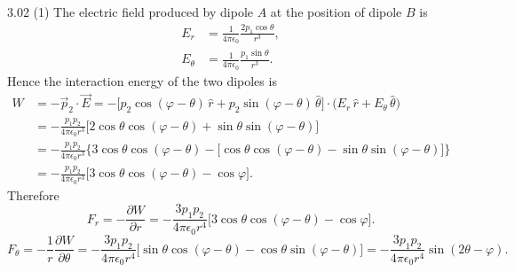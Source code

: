 \begin{solution}{3.02}
(1) The electric field produced by dipole $A$ at the position of dipole $B$ is
\begin{align*}
E_r&=\frac{1}{4\pi\epsilon_0}\frac{2p_1\cos\theta}{r^3},\\
E_\theta&=\frac{1}{4\pi\epsilon_0}\frac{p_1\sin\theta}{r^3}.
\end{align*}
Hence the interaction energy of the two dipoles is
\begin{align*}
W&=-\vec{p}_2\cdot\vec{E}
=-\bigl[p_2\cos(\varphi-\theta)\,\hat{r}+p_2\sin(\varphi-\theta)\,\hat{\theta}\bigr]
\cdot\bigl(E_r\,\hat{r}+E_\theta\,\hat{\theta}\bigr)\\
&=-\frac{p_1p_2}{4\pi\epsilon_0r^3}\bigl[2\cos\theta\cos(\varphi-\theta)+\sin\theta\sin(\varphi-\theta)\bigr]\\
&=-\frac{p_1p_2}{4\pi\epsilon_0r^3}\bigl\{3\cos\theta\cos(\varphi-\theta)
-\bigl[\cos\theta\cos(\varphi-\theta)-\sin\theta\sin(\varphi-\theta)\bigr]\bigr\}\\
&=-\frac{p_1p_2}{4\pi\epsilon_0r^3}\bigl[3\cos\theta\cos(\varphi-\theta)-\cos\varphi\bigr].
\end{align*}
Therefore
\[
F_r=-\frac{\partial W}{\partial r}
=-\frac{3p_1p_2}{4\pi\epsilon_0r^4}\bigl[3\cos\theta\cos(\varphi-\theta)-\cos\varphi\bigr].
\]
\[
F_\theta=-\frac{1}{r}\frac{\partial W}{\partial\theta}
=-\frac{3p_1p_2}{4\pi\epsilon_0r^4}\bigl[\sin\theta\cos(\varphi-\theta)-\cos\theta\sin(\varphi-\theta)\bigr]
=-\frac{3p_1p_2}{4\pi\epsilon_0r^4}\sin(2\theta-\varphi).
\]


\end{solution}
